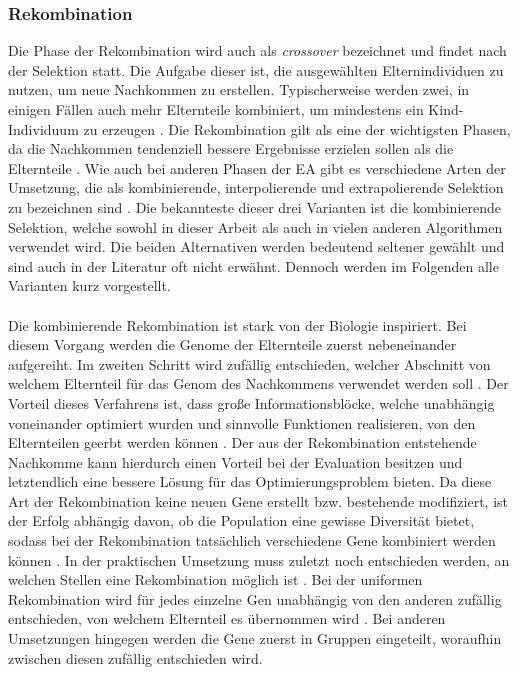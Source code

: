 \subsubsection{Rekombination}
\label{subsubsec:ea_recombination}
Die Phase der Rekombination wird auch als \emph{crossover} bezeichnet und findet nach der Selektion statt. Die Aufgabe dieser ist, die ausgewählten Elternindividuen zu nutzen, um neue Nachkommen zu erstellen. Typischerweise werden zwei, in einigen Fällen auch mehr Elternteile kombiniert, um mindestens ein Kind-Individuum zu erzeugen \cite{weicker2015evolutionare}. Die Rekombination gilt als eine der wichtigsten Phasen, da die Nachkommen tendenziell bessere Ergebnisse erzielen sollen als die Elternteile \cite{russell2013kunstliche}. Wie auch bei anderen Phasen der \ac{EA} gibt es verschiedene Arten der Umsetzung, die als kombinierende, interpolierende und extrapolierende Selektion zu bezeichnen sind \cite{weicker2015evolutionare}. Die bekannteste dieser drei Varianten ist die kombinierende Selektion, welche sowohl in dieser Arbeit als auch in vielen anderen Algorithmen verwendet wird. Die beiden Alternativen werden bedeutend seltener gewählt und sind auch in der Literatur oft nicht erwähnt. Dennoch werden im Folgenden alle Varianten kurz vorgestellt.
\\\\
Die kombinierende Rekombination ist stark von der Biologie inspiriert. Bei diesem Vorgang werden die Genome der Elternteile zuerst nebeneinander aufgereiht. Im zweiten Schritt wird zufällig entschieden, welcher Abschnitt von welchem Elternteil für das Genom des Nachkommens verwendet werden soll \cite{weicker2015evolutionare}. Der Vorteil dieses Verfahrens ist, dass große Informationsblöcke, welche unabhängig voneinander optimiert wurden und sinnvolle Funktionen realisieren, von den Elternteilen geerbt werden können \cite{russell2013kunstliche}. Der aus der Rekombination entstehende Nachkomme kann hierdurch einen Vorteil bei der Evaluation besitzen und letztendlich eine bessere Lösung für das Optimierungsproblem bieten. Da diese Art der Rekombination keine neuen Gene erstellt bzw. bestehende modifiziert, ist der Erfolg abhängig davon, ob die Population eine gewisse Diversität bietet, sodass bei der Rekombination tatsächlich verschiedene Gene kombiniert werden können \cite{weicker2015evolutionare}. In der praktischen Umsetzung muss zuletzt noch entschieden werden, an welchen Stellen eine Rekombination möglich ist \cite{rojas1996neural}. Bei der uniformen Rekombination wird für jedes einzelne Gen unabhängig von den anderen zufällig entschieden, von welchem Elternteil es übernommen wird \cite{weicker2015evolutionare}. Bei anderen Umsetzungen hingegen werden die Gene zuerst in Gruppen eingeteilt, woraufhin zwischen diesen zufällig entschieden wird.
